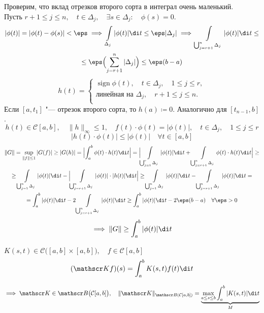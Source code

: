 \begin{iproof}
\begin{itemize}
			Проверим, что вклад отрезков второго сорта в интеграл очень маленький. \\
			Пусть $ r + 1 \le j \le n, \quad t \in \Delta_j, \quad \exists s \in \Delta_j : \quad \phi(s) = 0 $.
			\begin{multline*}
				|\phi(t)| = |\phi(t) - \phi(s)| < \eps \implies
				\int\limits_{\Delta_j} |\phi(t)| \di t \le \eps |\Delta_j| \implies
				\int\limits_{\bigcup_{j = r + 1}^n \Delta_j}|\phi(t)| \di t \le \\
				\le \eps \Bigl( \sum_{j = r + 1}^n |\Delta_j| \Bigr) \le
				\eps(b - a)
			\end{multline*}
			$$ h(t) =
			\begin{cases}
				\operatorname{sign} \phi(t), \quad t \in \Delta_j, \quad 1 \le j \le r, \\
				\text{линейная на } \Delta_j, \quad r + 1 \le j \le n. \\
			\end{cases} $$
			Если $ [a, t_1] $ "--- отрезок второго сорта, то $ h(a) \coloneq 0 $.
			Аналогично для $ [t_{n - 1}, b] $.
			$$ h(t) \in \mathcal C[a, b], \quad \|h\|_\infty \le 1, \quad
			f(t) \cdot \phi(t) = |\phi(t)|, \quad
			t \in \Delta_j, \quad 1 \le j \le r $$
			$$ |h(t) \cdot \phi(t)| \le |\phi(t)| \quad \forall t \in [a, b] $$
			\begin{multline*}
				\|G\| = \sup\limits_{\|f\| \le 1} |G(f)| \ge |G(h)| =
				\Bigl| \int_a^b \phi(t) \cdot h(t) \di t \Bigr| =
				\Bigl| \int\limits_{\bigcup_{j = 1}^r \Delta_j} |\phi(t)| \di t + \int\limits_{\bigcup_{j = r + 1}^n \Delta_j} \phi(t) \cdot h(t) \di t \Bigr| \ge \\
				\ge \int\limits_{\bigcup_{j = 1}^n \Delta_j} |\phi(t)| \di t - \Bigl| \int\limits_{\bigcup_{j = r + 1}^n \Delta_j} |\phi(t)| \cdot |h(t)| \di t \Bigr| \ge
				\int\limits_{\bigcup_{j = 1}^n \Delta_j} |\phi(t)| \di t - \int\limits_{\bigcup_{j = r + 1}^n \Delta_j} |\phi(t)| \di t = \\
				= \int_a^b |\phi(t)| \di t - 2 \int\limits_{\bigcup_{j = r + 1}^n \Delta_j} |\phi(t)| \di t \ge
				\int_a^b |\phi(t)| \di t - 2 \eps(b - a) \quad \forall \eps > 0
			\end{multline*}
			$$ \implies \|G\| \ge \int_a^b |\phi(t)| \di t $$
	\end{itemize}
\end{iproof}

\begin{theorem}
	$ K(s, t) \in \mathcal C \bigl( [a, b] \times [a, b] \bigr), \quad f \in \mathcal C[a, b] $
	$$ (\mathscr Kf)(s) = \int_a^b K(s, t)f(t) \di t $$

	$$ \implies \mathscr K \in \mathscr B \bigl( \mathcal C[a, b] \bigr), \quad
	\|\mathscr K\|_{\mathscr B(\mathcal C[a, b])} =
	\underbrace{\max\limits_{a \le s \le b} \int_a^b |K(s, t)| \di t}_M $$
\end{theorem}

